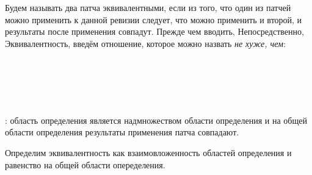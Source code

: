 Будем называть два патча эквивалентными, если из того, что один из
патчей можно применить к данной ревизии следует, что можно применить и
второй, и результаты после применения совпадут. Прежде чем вводить,
Непосредственно, Эквивалентность, введём отношение, которое можно
назвать \emph{не хуже, чем}:

\begin{code}%
\> \AgdaSymbol{:}  \AgdaSymbol{\{}  \AgdaSymbol{:} \AgdaSymbol{\}}\<%
\\
\>[0]\<[2]%
\>[2] \AgdaSymbol{(} \AgdaSymbol{:}  \AgdaSymbol{)}  \AgdaSymbol{(} \AgdaSymbol{:}  \AgdaSymbol{)}  \<%
\\
\> \AgdaSymbol{\{}\AgdaSymbol{\}}   \AgdaSymbol{=}  \AgdaSymbol{\{} \AgdaSymbol{:} \AgdaSymbol{\}}\<%
\\
\>[0]\<[2]%
\>[2] \AgdaSymbol{(} \AgdaSymbol{:}   \AgdaSymbol{)}   \AgdaSymbol{(}  \AgdaSymbol{)}    \<[43]%
\>[43]\<%
\\
\>[2]\<[4]%
\>[4]\AgdaSymbol{(}        \AgdaSymbol{))}\<%
\end{code}

  : область определения
 является надмножеством области определения
 и на общей области определения результаты применения
патча совпадают.

Определим эквивалентность как взаимовложенность областей определения
и равенство на общей области опеределения.

\begin{code}%
\> \AgdaSymbol{:}  \AgdaSymbol{\{}  \AgdaSymbol{:} \AgdaSymbol{\}}\<%
\\
\>[0]\<[2]%
\>[2] \AgdaSymbol{(} \AgdaSymbol{:}  \AgdaSymbol{)}  \AgdaSymbol{(} \AgdaSymbol{:}  \AgdaSymbol{)}  \<%
\\
\>   \AgdaSymbol{=} \AgdaSymbol{(}  \AgdaSymbol{)}  \AgdaSymbol{(}  \AgdaSymbol{)}\<%
\end{code}

